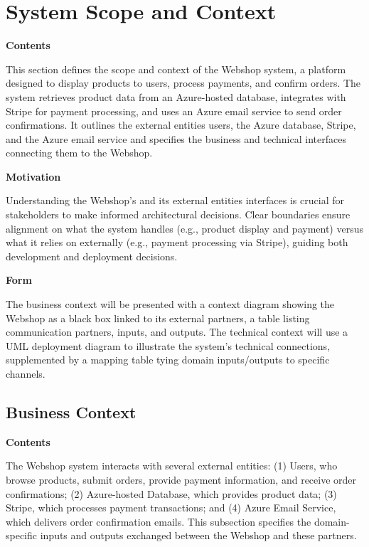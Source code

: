 \hypertarget{section-system-scope-and-context}{%
\section{System Scope and Context}\label{section-system-scope-and-context}}

\textbf{Contents}

This section defines the scope and context of the Webshop system, a platform designed to display products to users, process payments, and confirm orders. The system retrieves product data from an Azure-hosted database, integrates with Stripe for payment processing, and uses an Azure email service to send order confirmations. It outlines the external entities users, the Azure database, Stripe, and the Azure email service and specifies the business and technical interfaces connecting them to the Webshop.

\textbf{Motivation}

Understanding the Webshop's and its external entities interfaces is crucial for stakeholders to make informed architectural decisions. Clear boundaries ensure alignment on what the system handles (e.g., product display and payment) versus what it relies on externally (e.g., payment processing via Stripe), guiding both development and deployment decisions.

\textbf{Form}

The business context will be presented with a context diagram showing the Webshop as a black box linked to its external partners, a table listing communication partners, inputs, and outputs. The technical context will use a UML deployment diagram to illustrate the system’s technical connections, supplemented by a mapping table tying domain inputs/outputs to specific channels.

\hypertarget{_business_context}{%
\subsection{Business Context}\label{_business_context}}

\textbf{Contents}

The Webshop system interacts with several external entities: (1) Users, who browse products, submit orders, provide payment information, and receive order confirmations; (2) Azure-hosted Database, which provides product data; (3) Stripe, which processes payment transactions; and (4) Azure Email Service, which delivers order confirmation emails. This subsection specifies the domain-specific inputs and outputs exchanged between the Webshop and these partners.

